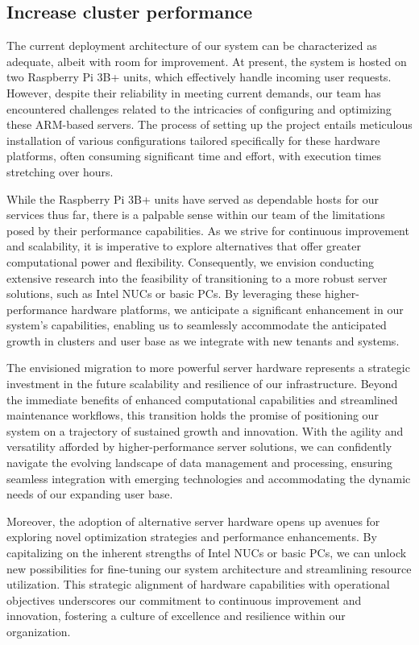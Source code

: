 \subsection{Increase cluster performance}
The current deployment architecture of our system can be characterized as
adequate, albeit with room for improvement. At present, the system is hosted on
two Raspberry Pi 3B+ units, which effectively handle incoming user requests.
However, despite their reliability in meeting current demands, our team has
encountered challenges related to the intricacies of configuring and optimizing
these ARM-based servers. The process of setting up the project entails
meticulous installation of various configurations tailored specifically for
these hardware platforms, often consuming significant time and effort, with
execution times stretching over hours.

While the Raspberry Pi 3B+ units have served as dependable hosts for our
services thus far, there is a palpable sense within our team of the limitations
posed by their performance capabilities. As we strive for continuous improvement
and scalability, it is imperative to explore alternatives that offer greater
computational power and flexibility. Consequently, we envision conducting
extensive research into the feasibility of transitioning to a more robust server
solutions, such as Intel NUCs or basic PCs. By leveraging these
higher-performance hardware platforms, we anticipate a significant enhancement
in our system's capabilities, enabling us to seamlessly accommodate the
anticipated growth in clusters and user base as we integrate with new tenants
and systems.

The envisioned migration to more powerful server hardware represents a strategic
investment in the future scalability and resilience of our infrastructure.
Beyond the immediate benefits of enhanced computational capabilities and
streamlined maintenance workflows, this transition holds the promise of
positioning our system on a trajectory of sustained growth and innovation. With
the agility and versatility afforded by higher-performance server solutions, we
can confidently navigate the evolving landscape of data management and
processing, ensuring seamless integration with emerging technologies and
accommodating the dynamic needs of our expanding user base.

Moreover, the adoption of alternative server hardware opens up avenues for
exploring novel optimization strategies and performance enhancements. By
capitalizing on the inherent strengths of Intel NUCs or basic PCs, we can unlock
new possibilities for fine-tuning our system architecture and streamlining
resource utilization. This strategic alignment of hardware capabilities with
operational objectives underscores our commitment to continuous improvement and
innovation, fostering a culture of excellence and resilience within our
organization.